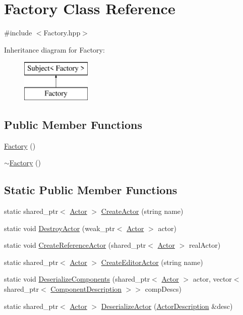 \hypertarget{class_factory}{}\section{Factory Class Reference}
\label{class_factory}


{\ttfamily \#include $<$Factory.\+hpp$>$}

Inheritance diagram for Factory\+:\begin{figure}[H]
\begin{center}
\leavevmode
\includegraphics[height=2.000000cm]{class_factory}
\end{center}
\end{figure}
\subsection*{Public Member Functions}
\begin{DoxyCompactItemize}
\item 
\hyperlink{class_factory_ac792bf88cfb7b6804b479529da5308cc}{Factory} ()
\item 
\hyperlink{class_factory_a8f71456f48e4df402c778a44191ff40e}{$\sim$\+Factory} ()
\end{DoxyCompactItemize}
\subsection*{Static Public Member Functions}
\begin{DoxyCompactItemize}
\item 
static shared\+\_\+ptr$<$ \hyperlink{class_actor}{Actor} $>$ \hyperlink{class_factory_a4d1f778e641569328fda27d6faf7b795}{Create\+Actor} (string name)
\item 
static void \hyperlink{class_factory_ac6f0a190052296cc9986fb6b5c7e0d60}{Destroy\+Actor} (weak\+\_\+ptr$<$ \hyperlink{class_actor}{Actor} $>$ actor)
\item 
static void \hyperlink{class_factory_a8ff3b9e48200289837a92865aae6c6aa}{Create\+Reference\+Actor} (shared\+\_\+ptr$<$ \hyperlink{class_actor}{Actor} $>$ real\+Actor)
\item 
static shared\+\_\+ptr$<$ \hyperlink{class_actor}{Actor} $>$ \hyperlink{class_factory_a793822c87c9d0c0c8519527ea5b294a9}{Create\+Editor\+Actor} (string name)
\item 
static void \hyperlink{class_factory_a7f56d55416496af6a2c75c62277d4f9c}{Deserialize\+Components} (shared\+\_\+ptr$<$ \hyperlink{class_actor}{Actor} $>$ actor, vector$<$ shared\+\_\+ptr$<$ \hyperlink{class_component_description}{Component\+Description} $>$$>$ comp\+Descs)
\item 
static shared\+\_\+ptr$<$ \hyperlink{class_actor}{Actor} $>$ \hyperlink{class_factory_a017c0ac2bad4a9517443e8ef51601d1c}{Deserialize\+Actor} (\hyperlink{struct_actor_description}{Actor\+Description} \&desc)
\end{DoxyCompactItemize}
